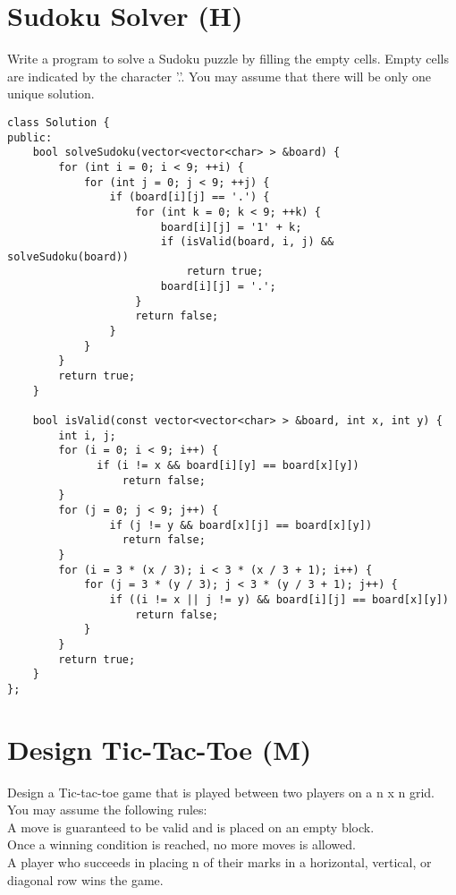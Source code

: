 \section{Sudoku Solver (H)}
Write a program to solve a Sudoku puzzle by filling the empty cells. Empty cells are indicated by the character '.'. You may assume that there will be only one unique solution. \\

\begin{lstlisting}
class Solution {
public:
    bool solveSudoku(vector<vector<char> > &board) {
        for (int i = 0; i < 9; ++i) {
            for (int j = 0; j < 9; ++j) {
                if (board[i][j] == '.') {
                    for (int k = 0; k < 9; ++k) {
                        board[i][j] = '1' + k;
                        if (isValid(board, i, j) && solveSudoku(board))
                            return true;
                        board[i][j] = '.';
                    }
                    return false;
                }
            }
        }
        return true;
    }

    bool isValid(const vector<vector<char> > &board, int x, int y) {
        int i, j;
        for (i = 0; i < 9; i++) {  
              if (i != x && board[i][y] == board[x][y])
                  return false;
        }
        for (j = 0; j < 9; j++) {  
                if (j != y && board[x][j] == board[x][y])
                  return false;
        }
        for (i = 3 * (x / 3); i < 3 * (x / 3 + 1); i++) {
            for (j = 3 * (y / 3); j < 3 * (y / 3 + 1); j++) {
                if ((i != x || j != y) && board[i][j] == board[x][y])
                    return false;
            }
        }
        return true;
    }
};
\end{lstlisting}


\section{Design Tic-Tac-Toe (M)}
Design a Tic-tac-toe game that is played between two players on a n x n grid. \\

You may assume the following rules:\\
A move is guaranteed to be valid and is placed on an empty block.\\
Once a winning condition is reached, no more moves is allowed.\\
A player who succeeds in placing n of their marks in a horizontal, vertical, or diagonal row wins the game.\\


